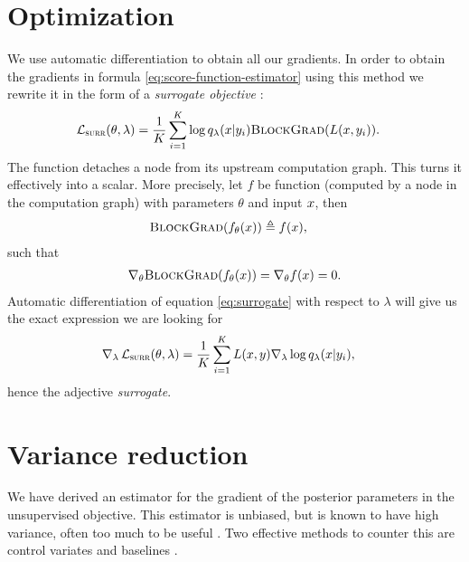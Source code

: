 \section{Optimization}
We use automatic differentiation \citep{Baydin+2017:AD} to obtain all our gradients. In order to obtain the gradients in formula \ref{eq:score-function-estimator} using this method we rewrite it in the form of a \textit{surrogate objective} \citep{Schulman+2015:surrogate}:
\begin{align}
  \label{eq:surrogate}
  \operatorname{\mathcal{L}}_{ \textsc{surr} }(\theta, \lambda) &= \frac{1}{K}\sum_{i=1}^K \log q_{\lambda}(x | y_i) \textsc{BlockGrad}( L(x, y_i) ).
\end{align}
The function \blockgrad detaches a node from its upstream computation graph. This turns it effectively into a scalar. More precisely, let $f$ be function (computed by a node in the computation graph) with parameters $\theta$ and input $x$, then
\begin{align*}
    \textsc{BlockGrad}(f_{\theta}( x )) &\triangleq f( x ),
\end{align*}
such that
\begin{align*}
    \nabla_{\theta}\textsc{BlockGrad}(f_{\theta}( x )) = \nabla_{\theta} f( x ) = 0.
\end{align*}
Automatic differentiation of equation \ref{eq:surrogate} with respect to $\lambda$ will give us the exact expression we are looking for
\begin{align*}
    \nabla_{\lambda} \operatorname{\mathcal{L}}_{ \textsc{surr} }(\theta, \lambda) &= \frac{1}{K}\sum_{i=1}^K L(x, y) \nabla_{\lambda} \log q_{\lambda}( x | y_i ),
\end{align*}
hence the adjective \textit{surrogate}.

\section{Variance reduction}
We have derived an estimator for the gradient of the posterior parameters in the unsupervised objective. This estimator is unbiased, but is known to have high variance, often too much to be useful \citep{Paisley+2012:VISS}. Two effective methods to counter this are control variates and baselines \citep{Ross:2006:SIM}.

